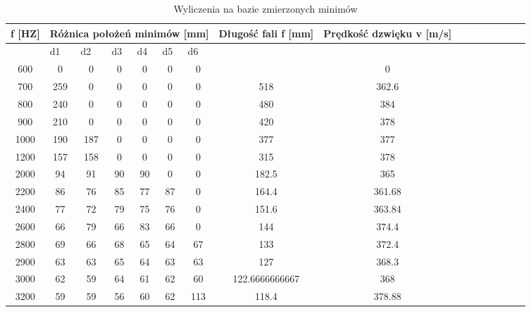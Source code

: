 \documentclass{article}
\begin{document}
\begin{table}[h!tbp]
\begin{center}
\centering
\begin{tabular}{|c|c|c|c|c|c|c|c|c|c|c|c|c|c|c|c|}
\hline
\multicolumn{1}{|c|}{f [HZ]} & \multicolumn{ 6}{c|}{Różnica położeń minimów [mm]} & \multicolumn{1}{c|}{Długość fali f [mm]} & \multicolumn{1}{c|}{Prędkość dzwięku v [m/s]} \\ \hline
\multicolumn{1}{|l|}{} & \multicolumn{1}{l|}{d1} & \multicolumn{1}{l|}{d2} & \multicolumn{1}{l|}{d3} & \multicolumn{1}{l|}{d4} & \multicolumn{1}{l|}{d5} & \multicolumn{1}{l|}{d6} & \multicolumn{1}{l|}{} & \multicolumn{1}{l|}{} \\ \hline
600 & 0 & 0 & 0 & 0 & 0 & 0 & \multicolumn{1}{l|}{} & 0 \\ \hline
700 & 259 & 0 & 0 & 0 & 0 & 0 & 518 & 362.6 \\ \hline
800 & 240 & 0 & 0 & 0 & 0 & 0 & 480 & 384 \\ \hline
900 & 210 & 0 & 0 & 0 & 0 & 0 & 420 & 378 \\ \hline
1000 & 190 & 187 & 0 & 0 & 0 & 0 & 377 & 377 \\ \hline
1200 & 157 & 158 & 0 & 0 & 0 & 0 & 315 & 378 \\ \hline
2000 & 94 & 91 & 90 & 90 & 0 & 0 & 182.5 & 365 \\ \hline
2200 & 86 & 76 & 85 & 77 & 87 & 0 & 164.4 & 361.68 \\ \hline
2400 & 77 & 72 & 79 & 75 & 76 & 0 & 151.6 & 363.84 \\ \hline
2600 & 66 & 79 & 66 & 83 & 66 & 0 & 144 & 374.4 \\ \hline
2800 & 69 & 66 & 68 & 65 & 64 & 67 & 133 & 372.4 \\ \hline
2900 & 63 & 63 & 65 & 64 & 63 & 63 & 127 & 368.3 \\ \hline
3000 & 62 & 59 & 64 & 61 & 62 & 60 & 122.6666666667 & 368 \\ \hline
3200 & 59 & 59 & 56 & 60 & 62 & 113 & 118.4 & 378.88 \\ \hline
\end{tabular}
\end{center}
\label{}
\caption{Wyliczenia na bazie zmierzonych minimów}
\end{table}



\end{document}
